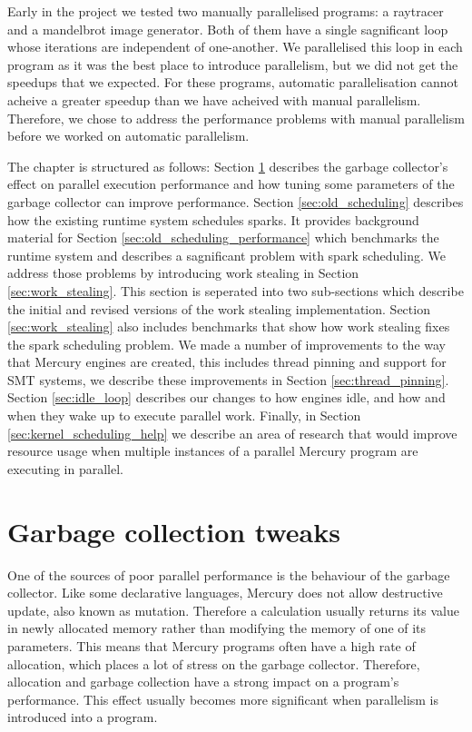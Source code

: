 

Early in the project
we tested two manually parallelised programs:
a raytracer and a mandelbrot image generator.
Both of them have a single sagnificant loop
whose iterations are independent of one-another.
We parallelised this loop in each program as it was the best place to
introduce parallelism,
but we did not get the speedups that we expected.
For these programs, automatic parallelisation cannot acheive
a greater speedup than we have acheived with manual parallelism.
Therefore,
we chose to address the performance problems with manual parallelism
before we worked on automatic parallelism.

The chapter is structured as follows:
Section \ref{sec:gc} describes the garbage collector's effect on parallel
execution performance and how tuning some parameters of the garbage
collector can improve performance.
Section \ref{sec:old_scheduling} describes how the existing runtime
system schedules sparks.
It provides background material for Section
\ref{sec:old_scheduling_performance}
which benchmarks the runtime system and describes a sagnificant problem with
spark scheduling.
We address those problems by introducing work stealing in Section
\ref{sec:work_stealing}.
This section is seperated into two sub-sections
which describe the initial and revised versions of the work stealing
implementation.
Section \ref{sec:work_stealing} also includes benchmarks that show
how work stealing fixes the spark scheduling problem.
We made a number of improvements to the way that Mercury engines are created,
this includes thread pinning and support for SMT systems,
we describe these improvements in Section \ref{sec:thread_pinning}.
Section \ref{sec:idle_loop} describes our changes to how engines idle,
and how and when they wake up to execute parallel work.
Finally, in Section \ref{sec:kernel_scheduling_help}
we describe an area of research that would improve resource usage when
multiple instances of a parallel Mercury program are executing in parallel.

\section{Garbage collection tweaks}
\label{sec:gc}

One of the sources of poor parallel performance is the behaviour of the
garbage collector.
Like some declarative languages,
Mercury does not allow destructive update, also known as mutation.%
Therefore a calculation usually returns its value in newly allocated memory
rather than modifying the memory of one of its parameters.
This means that Mercury programs often have a high rate of allocation,
which places a lot of stress on the garbage collector.
Therefore,
allocation and garbage collection have a strong impact on a program's
performance.
This effect usually becomes more significant when parallelism is introduced into a
program.

